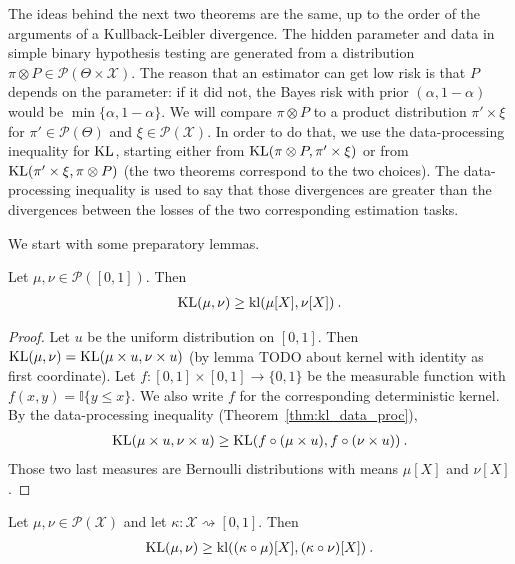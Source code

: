 The ideas behind the next two theorems are the same, up to the order of the arguments of a Kullback-Leibler divergence.
The hidden parameter and data in simple binary hypothesis testing are generated from a distribution $\pi \otimes P \in \mathcal P(\Theta \times \mathcal X)$.
The reason that an estimator can get low risk is that $P$ depends on the parameter: if it did not, the Bayes risk with prior $(\alpha, 1 - \alpha)$ would be $\min\{\alpha, 1 - \alpha\}$.
We will compare $\pi \otimes P$ to a product distribution $\pi' \times \xi$ for $\pi' \in \mathcal P(\Theta)$ and $\xi \in \mathcal P(\mathcal X)$.
In order to do that, we use the data-processing inequality for $\operatorname{KL}$, starting either from $\operatorname{KL}(\pi \otimes P, \pi' \times \xi)$ or from $\operatorname{KL}(\pi' \times \xi, \pi \otimes P)$ (the two theorems correspond to the two choices).
The data-processing inequality is used to say that those divergences are greater than the divergences between the losses of the two corresponding estimation tasks.

We start with some preparatory lemmas.


\begin{lemma}
  \label{lem:kl_bounded_ge_kl_mean}
  Let $\mu, \nu \in \mathcal P([0,1])$. Then
  \begin{align*}
  \operatorname{KL}(\mu, \nu) \ge \operatorname{kl}(\mu[X], \nu[X]) \: .
  \end{align*}
\end{lemma}

\begin{proof}%
{}
Let $u$ be the uniform distribution on $[0,1]$. Then $\operatorname{KL}(\mu, \nu) = \operatorname{KL}(\mu \times u, \nu \times u)$ (by lemma TODO about kernel with identity as first coordinate).
Let $f : [0,1] \times [0,1] \to \{0,1\}$ be the measurable function with $f(x, y) = \mathbb{I}\{y \le x\}$. We also write $f$ for the corresponding deterministic kernel. By the data-processing inequality (Theorem~\ref{thm:kl_data_proc}),
\begin{align*}
\operatorname{KL}(\mu \times u, \nu \times u)
\ge \operatorname{KL}(f \circ (\mu \times u), f \circ (\nu \times u))
\: .
\end{align*}
Those two last measures are Bernoulli distributions with means $\mu[X]$ and $\nu[X]$.
\end{proof}


\begin{corollary}
  \label{cor:kl_ge_kl_mean_comp}
  Let $\mu, \nu \in \mathcal P(\mathcal X)$ and let $\kappa : \mathcal X \rightsquigarrow [0,1]$. Then
  \begin{align*}
  \operatorname{KL}(\mu, \nu) \ge \operatorname{kl}((\kappa \circ \mu)[X], (\kappa \circ \nu)[X]) \: .
  \end{align*}
\end{corollary}

